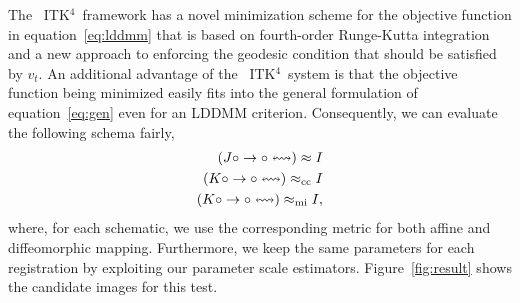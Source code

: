 \documentclass{llncs}
\newcommand{\tk}{~ITK$^{\text{4}}$~}
\begin{document}
The \tk framework has a novel minimization scheme for the objective
function in equation~\ref{eq:lddmm} that is based on fourth-order
Runge-Kutta integration and a new approach to enforcing the geodesic
condition that should be satisfied by $v_t$.  An additional advantage
of the \tk system is that the objective function being minimized
easily fits into the general formulation of equation~\ref{eq:gen} even
for an LDDMM criterion.  Consequently, we can evaluate the
following schema fairly,
\begin{eqnarray}
(J \circ \rightarrow \circ \leftrightsquigarrow ) \approx I  \\  \notag
(K \circ \rightarrow \circ \leftrightsquigarrow ) \approx_\text{cc} I  \\ \notag
(K \circ \rightarrow \circ \leftrightsquigarrow ) \approx_\text{mi} I,
\end{eqnarray}
where, for each schematic, we use the corresponding metric for both
affine and diffeomorphic mapping.  Furthermore, we keep the same
parameters for each registration by exploiting our parameter scale
estimators.  Figure~\ref{fig:result} shows the candidate images for
this test. 
\end{document}

